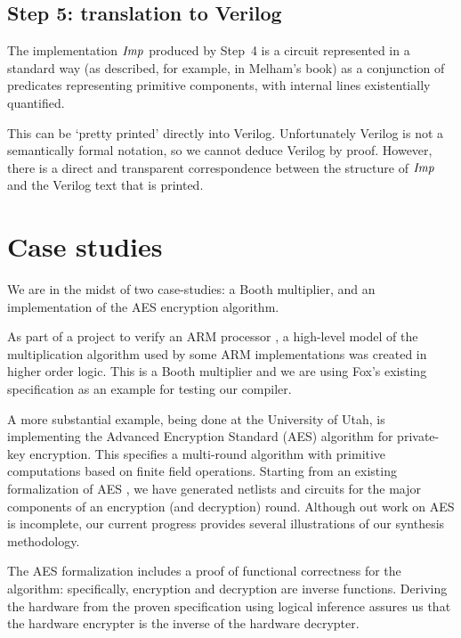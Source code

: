 \documentclass{llncs}
\begin{document}
\vspace*{-3mm}

\subsection*{Step 5: translation to Verilog}

The implementation ${\it{Imp}}$ produced by Step~4 is a circuit
represented in a standard way (as described, for example, in Melham's book)
as a conjunction of predicates representing primitive components,
with internal lines existentially quantified.

This can be `pretty printed' directly into Verilog. Unfortunately
Verilog is not a semantically formal notation, so we cannot deduce
Verilog by proof. However, there is a direct and transparent
correspondence between the structure of ${\it{Imp}}$ and the Verilog
text that is printed.

\section{Case studies}
\label{secCaseStudy}


We are in the midst of two case-studies: a Booth multiplier, and an implementation
of the AES encryption algorithm.

As part of a project to verify an ARM processor \cite{Fox02}, a
high-level model of the multiplication algorithm used by some ARM
implementations was created in higher order logic. This is a Booth
multiplier and we are using Fox's existing specification as an example
for testing our compiler.


A more substantial example, being done at the University of Utah, is
implementing the Advanced Encryption Standard (AES) \cite{AES}
algorithm for private-key encryption. This specifies a multi-round
algorithm with primitive computations based on finite field
operations.  Starting from an existing formalization of AES
\cite{slind:aes}, we have generated netlists and circuits for the major
components of an encryption (and decryption) round.  Although out work on AES
is incomplete, our current progress provides several illustrations of our
synthesis methodology.

The AES formalization includes a proof of functional correctness  for the
algorithm: specifically, encryption and decryption are inverse functions.
Deriving the hardware from the proven specification using logical inference
assures us that the hardware encrypter is the inverse of the hardware
decrypter.
\end{document}
